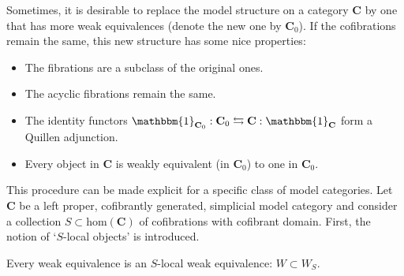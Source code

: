     Sometimes, it is desirable to replace the model structure on a category $\mathbf{C}$ by one that has more weak equivalences (denote the new one by $\mathbf{C}_0$). If the cofibrations remain the same, this new structure has some nice properties:
    \begin{itemize}
        \item The fibrations are a subclass of the original ones.
        \item The acyclic fibrations remain the same.
        \item The identity functors $\mathbbm{1}_{\mathbf{C}_0}:\mathbf{C}_0\leftrightarrows\mathbf{C}:\mathbbm{1}_\mathbf{C}$ form a Quillen adjunction.
        \item Every object in $\mathbf{C}$ is weakly equivalent (in $\mathbf{C}_0$) to one in $\mathbf{C}_0$.
    \end{itemize}

    This procedure can be made explicit for a specific class of model categories. Let $\mathbf{C}$ be a left proper, cofibrantly generated, simplicial model category and consider a collection $S\subset\mathrm{hom}(\mathbf{C})$ of cofibrations with cofibrant domain. First, the notion of `$S$-local objects' is introduced.
    \begin{property}
        Every weak equivalence is an $S$-local weak equivalence: $W\subset W_S$.
    \end{property}

